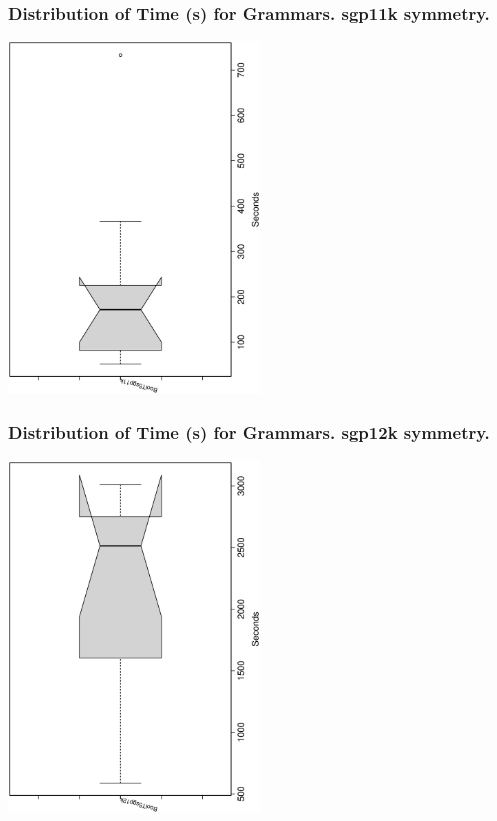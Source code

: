 \documentclass[18pt,c]{beamer}
\begin{document}
 \begin{frame}
 \frametitle{ Distribution of Time (s) for Grammars. sgp11k  symmetry. }
 \begin{center}
\includegraphics[width=0.5\textwidth, angle=-90]
{ExpFboxplottSeconds009.eps}
 \end{center}
 \label{ExpFboxplottSeconds009.eps}  
 \end{frame}

 \begin{frame}
 \frametitle{ Distribution of Time (s) for Grammars. sgp12k  symmetry. }
 \begin{center}
\includegraphics[width=0.5\textwidth, angle=-90]
{ExpFboxplottSeconds010.eps}
 \end{center}
 \label{ExpFboxplottSeconds010.eps}  
 \end{frame}
\end{document}
